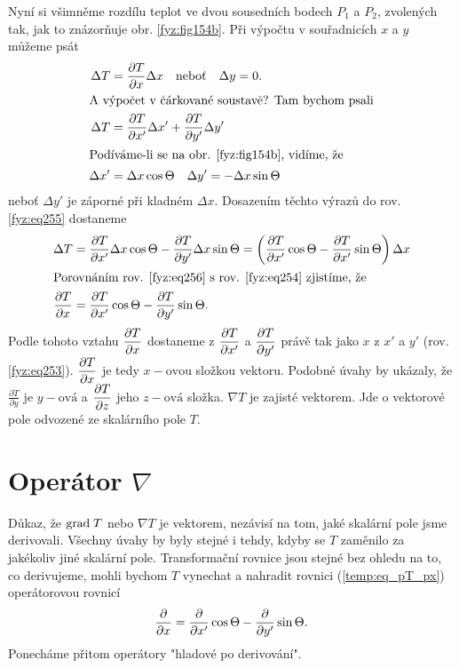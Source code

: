     Nyní si všimněme rozdílu teplot ve dvou sousedních bodech $P_1$ a $P_2$, zvolených tak, jak to
    znázorňuje obr. \ref{fyz:fig154b}. Při výpočtu v souřadnicích $x$ a $y$ můžeme psát
    \begin{align}
      \Delta T  &= \dfrac{\partial T}{\partial x}\Delta x \quad
                   \text{neboť} \quad \Delta y=0.   \label{fyz:eq254} \\ 
      \shortintertext{A výpočet v čárkované soustavě? Tam bychom psali}
      \Delta T  &= \dfrac{\partial T}{\partial x'}\Delta x' +
                   \dfrac{\partial T}{\partial y'}\Delta y'      \label{fyz:eq255}   \\
      \shortintertext{Podíváme-li se na obr. \ref{fyz:fig154b}, vidíme, že}
      \Delta x' &=  \Delta x\cos\Theta \quad \Delta y' = -\Delta x\sin\Theta
    \end{align}
    neboť $\Delta y'$ je záporné při kladném $\Delta x$. Dosazením těchto výrazů do rov.    
    \ref{fyz:eq255} dostaneme
    \begin{align}
      \Delta T    &=  \dfrac{\partial T}{\partial x'}\Delta x\cos\Theta
                     -\dfrac{\partial T}{\partial y'}\Delta x\sin\Theta 
                   =  \left(\dfrac{\partial T}{\partial x'}\cos\Theta   -
                      \dfrac{\partial T}{\partial x'}\sin\Theta\right)\Delta x  \label{fyz:eq256} \\
      \shortintertext{Porovnáním rov. \ref{fyz:eq256} s rov.   
                      \ref{fyz:eq254} zjistíme, že}
      \dfrac{\partial T}{\partial x} &=  \dfrac{\partial T}{\partial x'}\cos\Theta - \dfrac{\partial T}{\partial y'}\sin\Theta. \label{temp:eq_pT_px}
    \end{align}
    Podle tohoto vztahu $\dfrac{\partial T}{\partial x}$ dostaneme z $\dfrac{\partial T}{\partial x'}$ a $\dfrac{\partial T}{\partial y'}$ právě tak jako 
    $x$ z $x'$ a $y'$ (rov. \ref{fyz:eq253}). $\dfrac{\partial T}{\partial x}$ je tedy $x-\text{ovou}$ složkou 
    vektoru. Podobné úvahy by ukázaly, že $\frac{\partial T}{\partial y}$ je $y-\text{ová}$ a 
    $\dfrac{\partial T}{\partial z}$ jeho $z-\text{ová}$ složka. $\nabla T$ je zajisté vektorem. Jde o vektorové pole 
    odvozené ze skalárního pole $T$.
       
  \section{Operátor \texorpdfstring{\fontsize{16pt}{17pt}\selectfont\(\nabla\)}{nabla}}
    Důkaz, že $\mathrm{grad\;}T$ nebo $\nabla T$ je vektorem, nezávisí na tom, jaké skalární pole jsme 
    derivovali. Všechny úvahy by byly stejné i tehdy, kdyby se $T$ zaměnilo za jakékoliv jiné 
    skalární pole. Transformační rovnice jsou stejné bez ohledu na to, co derivujeme, mohli bychom 
    $T$ vynechat a nahradit rovnici (\ref{temp:eq_pT_px}) operátorovou rovnicí
    \begin{equation}\label{temp:eq_operatorova_rce}
      \dfrac{\partial  }{\partial x}=\dfrac{\partial  }{\partial x'}\cos\Theta - \dfrac{\partial  }{\partial y'}\sin\Theta.
    \end{equation}
    Ponecháme přitom operátory "hladové po derivování".

